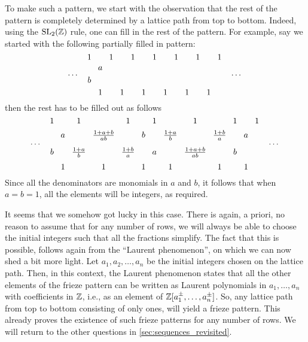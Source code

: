 \begin{example}
	To make such a pattern, we start with the observation that the rest of the pattern is
	completely determined by a lattice path from top to bottom. Indeed, using the
	$\operatorname{SL}_2(\mathbb{Z})$ rule, one can fill in the rest of the pattern. For example, say we
	started with the following partially filled in pattern:
	\begin{equation*}
		\dots\quad
		\begin{tikzcd}[
				sep = 0.2em, cramped,
			]
			1&&1&&1&&1&&1&&1&&1\\
			&a\\
			b\\
			&1&&1&&1&&1&&1&&1\\
		\end{tikzcd}
		\quad
		\dots
	\end{equation*}
	then the rest has to be filled out as follows
	\begin{equation*}
		\dots\quad
		\begin{tikzcd}[
				sep = 0.2em, cramped,
			]
			1&&1&&1&&1&&1&&1&&1\\
			&a&& \frac{1+a+b}{ab} && b && \frac{1+a}{b} && \frac{1+b}{a} && a\\
			b&& \frac{1+a}{b} &&  \frac{1+b}{a} && a && \frac{1+a+b}{ab} && b\\
			&1&&1&&1&&1&&1&&1\\
		\end{tikzcd}
		\quad
		\dots
	\end{equation*}
	Since all the denominators are monomials in $a$ and $b$, it follows that when $a = b =
		1$, all the elements will be integers, as required.

	It seems that we somehow got lucky in this case. There is again, a priori, no reason to
	assume that for any number of rows, we will always be able to choose the initial
	integers such that all the fractions simplify. The fact that this is possible, follows
	again from the ``Laurent phenomenon'', on which we can now
	shed a bit more light. Let $a_1, a_2, \dots, a_n$ be the initial integers chosen on the
	lattice path. Then, in this context, the Laurent phenomenon states that all the other
	elements of the frieze pattern can be written as Laurent
	polynomials in $a_1 , \dots, a_n$ with coefficients in
	$\mathbb{Z}$, i.e., as an element of $\mathbb{Z} [a_1 ^\pm, \dots, a_n^\pm]$. So, any lattice path
	from top to bottom consisting of only ones, will yield a frieze pattern. This already
	proves the existence of such frieze patterns for any number of rows. We will return to
	the other questions in \cref{sec:sequences_revisited}.
\end{example}

